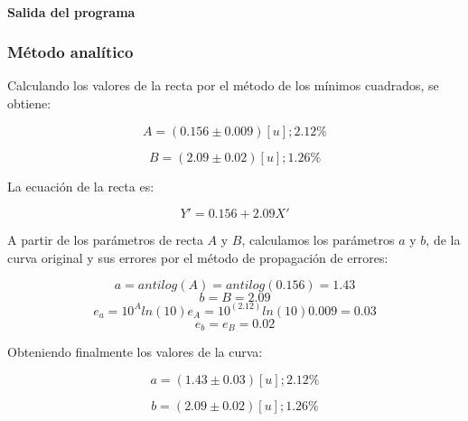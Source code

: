 \documentclass[letter,11pt]{article}
\begin{document}
\paragraph{Salida del programa}
\begin{alltt}
\footnotesize

\normalsize
\end{alltt}

\subsubsection{Método analítico}
Calculando los valores de la recta por el método de los mínimos cuadrados, se
obtiene:

\begin{equation*}
    A = (0.156 \pm 0.009)[u];2.12\%
\end{equation*}

\begin{equation*}
    B = (2.09 \pm 0.02)[u];1.26\%
\end{equation*}

La ecuación de la recta es:

\begin{equation*}
    Y' = 0.156 + 2.09 X'
\end{equation*}

A partir de los parámetros de recta $A$ y $B$, calculamos los parámetros $a$ y
$b$, de la curva original y sus errores por el método de propagación de errores:

\begin{equation*}
    a = antilog(A) = antilog(0.156) = 1.43
\end{equation*}
\begin{equation*}
    b = B = 2.09
\end{equation*}
\begin{equation*}
    e_a = 10^A ln(10) e_A = 10^{(2.12)} ln(10) 0.009 = 0.03
\end{equation*}
\begin{equation*}
    e_b = e_B = 0.02
\end{equation*}

Obteniendo finalmente los valores de la curva:

\begin{equation*}
    a = (1.43 \pm 0.03)[u];2.12\%
\end{equation*}

\begin{equation*}
    b = (2.09 \pm 0.02)[u];1.26\%
\end{equation*}
\end{document}
